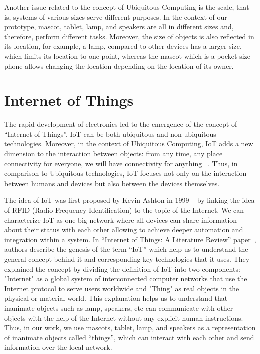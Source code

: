 Another issue related to the concept of Ubiquitous Computing is the scale,
that is, systems of various sizes serve different purposes.
In the context of our prototype, mascot, tablet, lamp, and speakers are all in
different sizes and, therefore, perform different tasks.
Moreover, the size of objects is also reflected in its location, for example, a lamp, compared
to other devices has a larger size, which limits its location to one point, whereas the mascot
which is a pocket-size phone allows changing the location depending on the location of its owner.

\section{Internet of Things}
\label{sec:Internet of Things}
The rapid development of electronics led to the emergence of the concept of “Internet of Things”.
IoT can be both ubiquitous and non-ubiquitous technologies.
Moreover, in the context of Ubiquitous
Computing, IoT adds a new dimension to the interaction between objects: from any time, any place
connectivity for everyone, we will have connectivity for anything ~\cite{tan2010future}.
Thus, in comparison to Ubiquitous technologies, IoT focuses not only on the interaction
between humans and devices but also between the devices themselves.

The idea of IoT was first proposed by Kevin Ashton in 1999 ~\cite{ashton2009internet}
by linking the idea of RFID (Radio Frequency Identification) to the topic of the Internet.
We can characterize IoT as one big network where all devices can share information about their status with
each other allowing to achieve deeper automation and integration within a system.
In “Internet of Things: A Literature Review” paper~\cite{madakam2015internet}, authors describe
the genesis of the term “IoT” which help us to understand the general concept behind it and
corresponding key technologies that it uses.
They explained the concept by dividing the definition of IoT into two components: "Internet"
as a global system of interconnected computer networks that use the Internet protocol to serve users worldwide
and "Thing" as real objects in the physical or material world.
This explanation helps us to understand that inanimate objects such as lamp, speakers,
etc can communicate with other objects with the help of the Internet without any explicit human instructions.
Thus, in our work, we use mascots, tablet, lamp, and speakers as a representation of inanimate
objects called “things”, which can interact with each other and send information over the local network.

